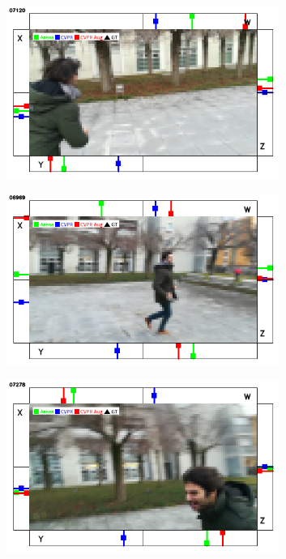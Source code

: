 \begin{figure}[H]
	\begin{center}
		\begin{subfigure}[h]{0.49\textwidth}
			\centering
			\includegraphics[width=0.98\textwidth]{"contents/images/qualitative-videos/running1-square02-712"}
		\end{subfigure}
		\hfill
		\begin{subfigure}[h]{0.49\textwidth}
			\centering
			\includegraphics[width=0.98\textwidth]{"contents/images/qualitative-videos/running1-square02-6969"}
		\end{subfigure}
		\vfill
		\begin{subfigure}[h]{0.49\textwidth}
			\centering
			\includegraphics[width=0.98\textwidth]{"contents/images/qualitative-videos/running1-square02-7278"}

\end{subfigure}
\end{center}
\end{figure}
